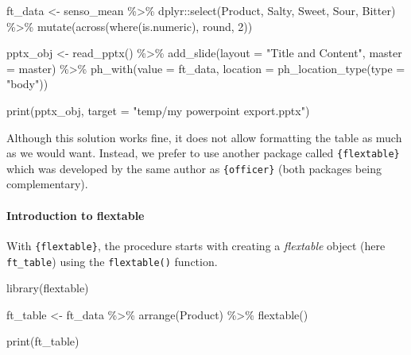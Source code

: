 \documentclass[
]{book}
\newenvironment{Shaded}{\begin{snugshade}}{\end{snugshade}}
\newcommand{\AttributeTok}[1]{\textcolor[rgb]{0.77,0.63,0.00}{#1}}
\newcommand{\DecValTok}[1]{\textcolor[rgb]{0.00,0.00,0.81}{#1}}
\newcommand{\FunctionTok}[1]{\textcolor[rgb]{0.00,0.00,0.00}{#1}}
\newcommand{\NormalTok}[1]{#1}
\newcommand{\OtherTok}[1]{\textcolor[rgb]{0.56,0.35,0.01}{#1}}
\newcommand{\SpecialCharTok}[1]{\textcolor[rgb]{0.00,0.00,0.00}{#1}}
\newcommand{\StringTok}[1]{\textcolor[rgb]{0.31,0.60,0.02}{#1}}
\begin{document}
\begin{Shaded}
\begin{Highlighting}[]
\NormalTok{ft\_data }\OtherTok{\textless{}{-}}\NormalTok{ senso\_mean }\SpecialCharTok{\%\textgreater{}\%}
\NormalTok{  dplyr}\SpecialCharTok{::}\FunctionTok{select}\NormalTok{(Product, Salty, Sweet, Sour, Bitter) }\SpecialCharTok{\%\textgreater{}\%} 
  \FunctionTok{mutate}\NormalTok{(}\FunctionTok{across}\NormalTok{(}\FunctionTok{where}\NormalTok{(is.numeric), round, }\DecValTok{2}\NormalTok{)) }

\NormalTok{pptx\_obj }\OtherTok{\textless{}{-}} \FunctionTok{read\_pptx}\NormalTok{() }\SpecialCharTok{\%\textgreater{}\%}
  \FunctionTok{add\_slide}\NormalTok{(}\AttributeTok{layout =} \StringTok{"Title and Content"}\NormalTok{, }\AttributeTok{master =}\NormalTok{ master) }\SpecialCharTok{\%\textgreater{}\%}
  \FunctionTok{ph\_with}\NormalTok{(}\AttributeTok{value =}\NormalTok{ ft\_data, }\AttributeTok{location =} \FunctionTok{ph\_location\_type}\NormalTok{(}\AttributeTok{type =} \StringTok{"body"}\NormalTok{))}

\FunctionTok{print}\NormalTok{(pptx\_obj, }\AttributeTok{target =} \StringTok{"temp/my powerpoint export.pptx"}\NormalTok{)}
\end{Highlighting}
\end{Shaded}

Although this solution works fine, it does not allow formatting the table as much as we would want. Instead, we prefer to use another package called \texttt{\{flextable\}} which was developed by the same author as \texttt{\{officer\}} (both packages being complementary).

\hypertarget{introduction-to-flextable}{%
\paragraph{Introduction to flextable}\label{introduction-to-flextable}}

With \texttt{\{flextable\}}, the procedure starts with creating a \emph{flextable} object (here \texttt{ft\_table}) using the \texttt{flextable()} function.

\begin{Shaded}
\begin{Highlighting}[]
\FunctionTok{library}\NormalTok{(flextable)}

\NormalTok{ft\_table }\OtherTok{\textless{}{-}}\NormalTok{ ft\_data }\SpecialCharTok{\%\textgreater{}\%} 
  \FunctionTok{arrange}\NormalTok{(Product) }\SpecialCharTok{\%\textgreater{}\%} 
  \FunctionTok{flextable}\NormalTok{()}

\FunctionTok{print}\NormalTok{(ft\_table)}
\end{Highlighting}
\end{Shaded}
\end{document}
